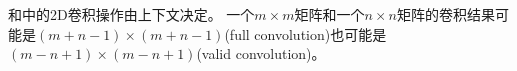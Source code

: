 和中的2D卷积操作由上下文决定。
一个$m\times m$矩阵和一个$n\times n$矩阵的卷积结果可能是$(m+n− 1) \times (m + n − 1)$(full convolution)也可能是$(m − n + 1) \times  (m − n + 1)$(valid convolution)。













